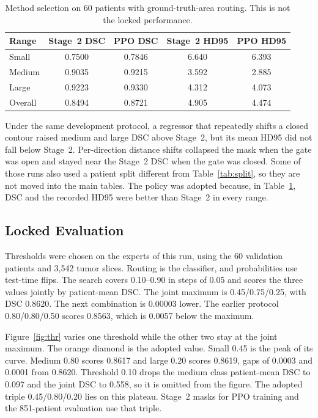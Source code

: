\documentclass[runningheads]{llncs}
\begin{document}
\begin{table}[!ht]
\caption{Method selection on 60 patients with ground-truth-area routing. This is not the locked performance.}
\label{tab:select}
\centering
\begin{tabular}{|l|c|c|c|c|}
\hline
Range & Stage~2 DSC & PPO DSC & Stage~2 HD95 & PPO HD95 \\
\hline
Small & 0.7500 & 0.7846 & 6.640 & 6.393 \\
\hline
Medium & 0.9035 & 0.9215 & 3.592 & 2.885 \\
\hline
Large & 0.9223 & 0.9330 & 4.312 & 4.073 \\
\hline
Overall & 0.8494 & 0.8721 & 4.905 & 4.474 \\
\hline
\end{tabular}
\end{table}

Under the same development protocol, a regressor that repeatedly shifts a closed contour raised medium and large DSC above Stage~2, but its mean HD95 did not fall below Stage~2. Per-direction distance shifts collapsed the mask when the gate was open and stayed near the Stage~2 DSC when the gate was closed. Some of those runs also used a patient split different from Table~\ref{tab:split}, so they are not moved into the main tables. The policy was adopted because, in Table~\ref{tab:select}, DSC and the recorded HD95 were better than Stage~2 in every range.

\subsection{Locked Evaluation}
\label{sec:locked}
Thresholds were chosen on the experts of this run, using the 60 validation patients and 3{,}542 tumor slices. Routing is the classifier, and probabilities use test-time flips. The search covers 0.10--0.90 in steps of 0.05 and scores the three values jointly by patient-mean DSC. The joint maximum is 0.45/0.75/0.25, with DSC 0.8620. The next combination is 0.00003 lower. The earlier protocol 0.80/0.80/0.50 scores 0.8563, which is 0.0057 below the maximum.

Figure~\ref{fig:thr} varies one threshold while the other two stay at the joint maximum. The orange diamond is the adopted value. Small 0.45 is the peak of its curve. Medium 0.80 scores 0.8617 and large 0.20 scores 0.8619, gaps of 0.0003 and 0.0001 from 0.8620. Threshold 0.10 drops the medium class patient-mean DSC to 0.097 and the joint DSC to 0.558, so it is omitted from the figure. The adopted triple 0.45/0.80/0.20 lies on this plateau. Stage~2 masks for PPO training and the 851-patient evaluation use that triple.
\end{document}
